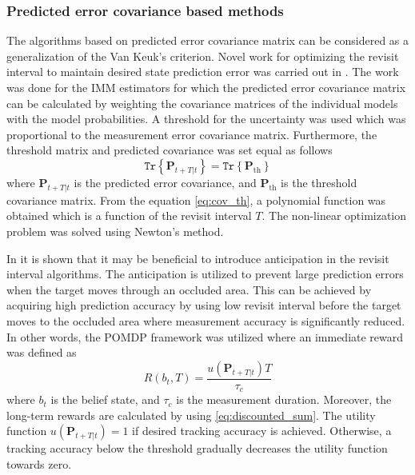 \documentclass[english, 12pt, a4paper, elec, utf8, a-1b, online]{aaltothesis}
\newcommand{\tr}[1]{\texttt{Tr}\left\{ #1 \right\}}
\renewcommand{\vec}[1]{\mathbf{#1}}
\begin{document}
\subsubsection{Predicted error covariance based methods} \label{sec:error_covariance_methods}

The algorithms based on predicted error covariance matrix can be considered as a generalization of the Van Keuk's criterion.  
Novel work for optimizing the revisit interval to maintain desired state prediction error was carried out in \cite{Watson1993}.
The work was done for the IMM estimators for which the predicted error covariance matrix can be calculated by weighting the covariance matrices of the individual models with the model probabilities.
A threshold for the uncertainty was used which was proportional to the measurement error covariance matrix.
Furthermore, the threshold matrix and predicted covariance was set equal as follows  
\begin{equation}\label{eq:cov_th}
    \tr{ \vec{P}_{t+T|t} } = \tr{ \vec{P}_{\text{th}} }
\end{equation}
where $\vec{P}_{t+T|t}$ is the predicted error covariance, and $\vec{P}_{\text{th}}$ is the threshold covariance matrix.
From the equation \eqref{eq:cov_th}, a polynomial function was obtained which is a function of the revisit interval $T$.
The non-linear optimization problem was solved using Newton's method.



In \cite{Charlish2015} it is shown that it may be beneficial to introduce anticipation in the revisit interval algorithms.
The anticipation is utilized to prevent large prediction errors when the target moves through an occluded area.
This can be achieved by acquiring high prediction accuracy by using low revisit interval before the target moves to the occluded area where measurement accuracy is significantly reduced.
In other words, the POMDP framework was utilized where an immediate reward was defined as
\begin{equation}
    R(b_t, T) = \frac{u\left(\vec{P}_{t+T|t} \right) T}{\tau_c}
\end{equation}
where $b_t$ is the belief state, and $\tau_c$ is the measurement duration.
Moreover, the long-term rewards are calculated by using \eqref{eq:discounted_sum}.
The utility function $u\left(\vec{P}_{t+T|t} \right)=1$ if desired tracking accuracy is achieved.
Otherwise, a tracking accuracy below the threshold gradually decreases the utility function towards zero.
\end{document}

